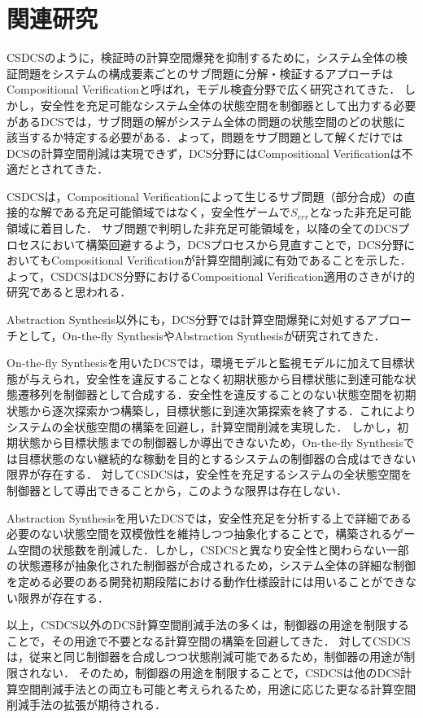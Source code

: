 \section{関連研究}
\label{section:relatedwork}
CSDCSのように，検証時の計算空間爆発を抑制するために，システム全体の検証問題をシステムの構成要素ごとのサブ問題に分解・検証するアプローチはCompositional Verificationと呼ばれ，モデル検査分野で広く研究されてきた\cite{paper:CompositionalVerification_1}\cite{paper:CompositionalVerification_2}\cite{paper:CompositionalVerification_3}\cite{paper:CompositionalVerification_4}\cite{paper:CompositionalVerification_5}\cite{paper:CompositionalVerification_6}\cite{paper:CompositionalVerification_7}\cite{paper:CompositionalVerification_8}．
しかし，安全性を充足可能なシステム全体の状態空間を制御器として出力する必要があるDCSでは，サブ問題の解がシステム全体の問題の状態空間のどの状態に該当するか特定する必要がある．よって，問題をサブ問題として解くだけではDCSの計算空間削減は実現できず，DCS分野にはCompositional Verificationは不適だとされてきた．

CSDCSは，Compositional Verificationによって生じるサブ問題（部分合成）の直接的な解である充足可能領域ではなく，安全性ゲームで$S_{err}$となった非充足可能領域に着目した．
サブ問題で判明した非充足可能領域を，以降の全てのDCSプロセスにおいて構築回避するよう，DCSプロセスから見直すことで，DCS分野においてもCompositional Verificationが計算空間削減に有効であることを示した．よって，CSDCSはDCS分野におけるCompositional Verification適用のさきがけ的研究であると思われる．

Abstraction Synthesis以外にも，DCS分野では計算空間爆発に対処するアプローチとして，On-the-fly SynthesisやAbstraction Synthesisが研究されてきた．

On-the-fly Synthesisを用いたDCS\cite{paper:On-the-flySyntehsis_1}\cite{paper:On-the-flySyntehsis_2}\cite{paper:On-the-flySyntehsis_3}\cite{paper:On-the-flySyntehsis_4}では，環境モデルと監視モデルに加えて目標状態が与えられ，安全性を違反することなく初期状態から目標状態に到達可能な状態遷移列を制御器として合成する．安全性を違反することのない状態空間を初期状態から逐次探索かつ構築し，目標状態に到達次第探索を終了する．これによりシステムの全状態空間の構築を回避し，計算空間削減を実現した．
しかし，初期状態から目標状態までの制御器しか導出できないため，On-the-fly Synthesisでは目標状態のない継続的な稼動を目的とするシステムの制御器の合成はできない限界が存在する．
対してCSDCSは，安全性を充足するシステムの全状態空間を制御器として導出できることから，このような限界は存在しない．

Abstraction Synthesisを用いたDCS\cite{paper:SynthesisAbstraction_1}\cite{paper:SynthesisAbstraction_2}\cite{aizawa:IEICEJ2020}では，安全性充足を分析する上で詳細である必要のない状態空間を双模倣性を維持しつつ抽象化することで，構築されるゲーム空間の状態数を削減した．しかし，CSDCSと異なり安全性と関わらない一部の状態遷移が抽象化された制御器が合成されるため，システム全体の詳細な制御を定める必要のある開発初期段階における動作仕様設計には用いることができない限界が存在する．

以上，CSDCS以外のDCS計算空間削減手法の多くは，制御器の用途を制限することで，その用途で不要となる計算空間の構築を回避してきた．
対してCSDCSは，従来と同じ制御器を合成しつつ状態削減可能であるため，制御器の用途が制限されない．
そのため，制御器の用途を制限することで，CSDCSは他のDCS計算空間削減手法との両立も可能と考えられるため，用途に応じた更なる計算空間削減手法の拡張が期待される．